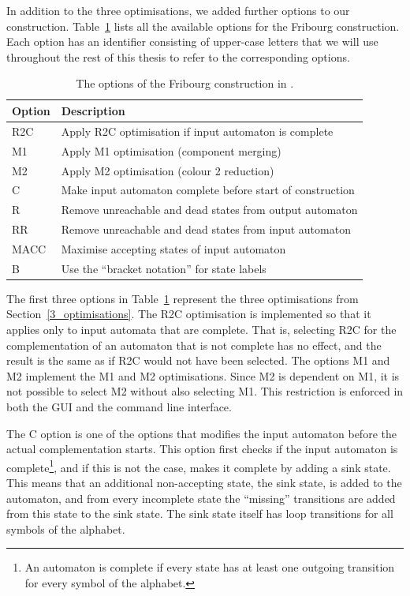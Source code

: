 In addition to the three optimisations, we added further options to our construction. Table~\ref{goal_options} lists all the available options for the Fribourg construction. Each option has an identifier consisting of upper-case letters that we will use throughout the rest of this thesis to refer to the corresponding options.

\begin{table}
\centering
\begin{tabular}{ll}
\hline
Option & Description \\
\hline
R2C & Apply R2C optimisation if input automaton is complete \\
M1 & Apply M1 optimisation (component merging) \\
M2 & Apply M2 optimisation (colour 2 reduction) \\
C & Make input automaton complete before start of construction \\
R & Remove unreachable and dead states from output automaton \\
RR & Remove unreachable and dead states from input automaton \\
MACC & Maximise accepting states of input automaton \\
B & Use the ``bracket notation'' for state labels \\
\hline
\end{tabular}
\caption{The options of the Fribourg construction in \goal.}
\label{goal_options}
\end{table}

The first three options in Table~\ref{goal_options} represent the three optimisations from Section~\ref{3_optimisations}. The R2C optimisation is implemented so that it applies only to input automata that are complete. That is, selecting R2C for the complementation of an automaton that is not complete has no effect, and the result is the same as if R2C would not have been selected. The options M1 and M2 implement the M1 and M2 optimisations. Since M2 is dependent on M1, it is not possible to select M2 without also selecting M1. This restriction is enforced in both the GUI and the command line interface.

The C option is one of the options that modifies the input automaton before the actual complementation starts. This option first checks if the input automaton is complete\footnote{An automaton is complete if every state has at least one outgoing transition for every symbol of the alphabet.}, and if this is not the case, makes it complete by adding a sink state. This means that an additional non-accepting state, the sink state, is added to the automaton, and from every incomplete state the ``missing'' transitions are added from this state to the sink state. The sink state itself has loop transitions for all symbols of the alphabet.

